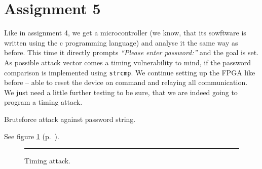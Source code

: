 \section*{Assignment 5}
%
% 

Like in assignment 4, we get a microcontroller (we know, that its sowftware is written using the c programming language) and analyse it the same way as before. 
This time it directly prompts \textit{``Please enter password:''} and the goal is set. As possible attack vector comes a timing vulnerability to mind, if the password comparison is implemented using \texttt{strcmp}. We continue setting up the FPGA like before -- able to reset the device on command and relaying all communication. We just need a little further testing to be sure, that we are indeed going to program a timing attack.

Bruteforce attack against password string. 

See figure \ref{fig:as5-schematic} (p.~\pageref{fig:as5-schematic}).

\begin{figure}[tb]
    \begin{center}
        
        \caption{Timing attack.}
        \label{fig:as5-schematic}
        \vspace{1em}\hrule
    \end{center}
\end{figure}

